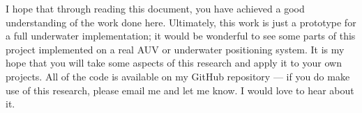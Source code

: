 \documentclass[11pt]{ucthesisCP}
\begin{document}
I hope that through reading this document, you have achieved a good understanding of the work done here. Ultimately, this work is just a prototype for a full underwater implementation; it would be wonderful to see some parts of this project implemented on a real AUV or underwater positioning system. It is my hope that you will take some aspects of this research and apply it to your own projects. All of the code is available on my GitHub repository --- if you do make use of this research, please email me and let me know. I would love to hear about it.

\clearpage


\end{document}
